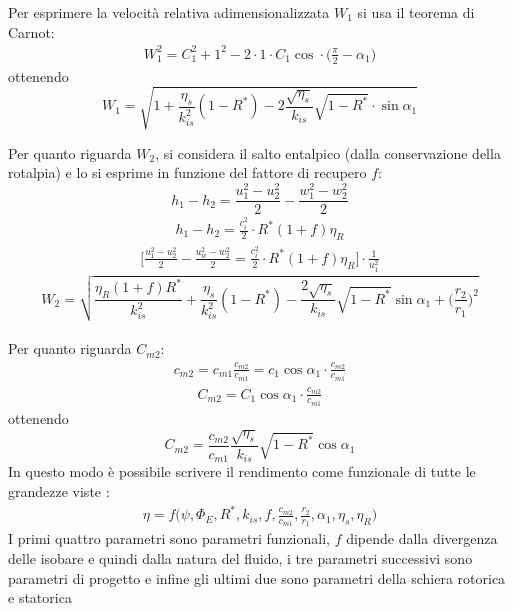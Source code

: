 Per esprimere la velocità relativa adimensionalizzata $W_1$ si usa il teorema di Carnot:
\begin{align*}
W_1^2 = C_1^2 + 1^2 - 2 \cdot 1 \cdot C_1 \cos \cdot \big( \frac{\pi}{2} - \alpha_1 \big)
\end{align*}
ottenendo
\begin{equation}
\boxed{ W_1 = \sqrt{1 + \frac{\eta_{s}}{k_{is}^2} \left( 1 - R^* \right) - 2 \frac{\sqrt{\eta_s}}{k_{is}} \sqrt{1-R^*} \cdot \sin \alpha_1}}
\label{eq:W1}
\end{equation}

Per quanto riguarda $W_2$, si considera il salto entalpico (dalla conservazione della rotalpia) e lo si esprime in funzione del fattore di recupero $f$:
\begin{equation}
h_1 - h_2 = \frac{u_1^2 - u_2^2}{2} - \frac{w_1^2 - w_2^2}{2}
\end{equation}
\begin{align*}
h_1 - h_2 = \frac{c_i^2}{2} \cdot R^* \left( 1 + f \right) \eta_R
\end{align*}
\begin{align*}
\Bigg[\frac{u_1^2 - u_2^2}{2} - \frac{u_w^2 - w_2^2}{2} = \frac{c_i^2}{2} \cdot R^* \left( 1 + f \right) \eta_R \Bigg] \cdot \frac{1}{u_1^2}
\end{align*}
\begin{equation}
\boxed{W_2 = \sqrt{\frac{\eta_R \left( 1 + f \right) R^*}{k_{is}^2} + \frac{\eta_s}{k_{is}^2}  \left(1 - R^* \right) - \frac{2 \sqrt{\eta_s}}{k_{is}} \sqrt{1 - R^*} \sin \alpha_1 + \bigg(\frac{r_2}{r_1} \bigg)^2 } }
\end{equation}
\\Per quanto riguarda $C_{m2}$:
\begin{align*}
c_{m2} = c_{m1} \frac{c_{m2}}{c_{m1}}=c_1 \cos \alpha_1 \cdot \frac{c_{m2}}{c_{m1}}
\end{align*}
\begin{align*}
C_{m2} = C_1 \cos \alpha_1 \cdot \frac{c_{m2}}{c_{m1}}
\end{align*}
ottenendo
\begin{equation}
\boxed{C_{m2} = \frac{c_{m2}}{c_{m1}} \frac{\sqrt{\eta_s}}{k_{is}} \sqrt{1 - R^*} \cos \alpha_1 }
\end{equation}
In questo modo è possibile scrivere il rendimento come funzionale di tutte le grandezze viste :
\begin{align*}
\boxed{\eta = f \bigg( \psi, \Phi_E, R^*, k_{is}, f, \frac{c_{m2}}{c_{m1}}, \frac{r_2}{r_1}, \alpha_1, \eta_s, \eta_R \bigg)}
\end{align*}
I primi quattro parametri sono parametri funzionali, $f$ dipende dalla divergenza delle isobare e quindi dalla natura del fluido, i tre parametri successivi sono parametri di progetto e infine gli ultimi due sono parametri della schiera rotorica e statorica

